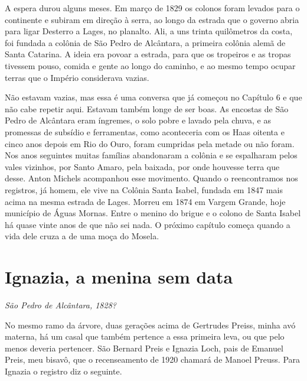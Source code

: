 \documentclass[
  brazilian,
  11pt,
  openany]{book}
\begin{document}
A espera durou alguns meses. Em março de 1829 os colonos foram levados
para o continente e subiram em direção à serra, ao longo da estrada que
o governo abria para ligar Desterro a Lages, no planalto. Ali, a uns
trinta quilômetros da costa, foi fundada a colônia de São Pedro de
Alcântara, a primeira colônia alemã de Santa Catarina. A ideia era
povoar a estrada, para que os tropeiros e as tropas tivessem pouso,
comida e gente ao longo do caminho, e ao mesmo tempo ocupar terras que o
Império considerava vazias.

Não estavam vazias, mas essa é uma conversa que já começou no Capítulo 6
e que não cabe repetir aqui. Estavam também longe de ser boas. As
encostas de São Pedro de Alcântara eram íngremes, o solo pobre e lavado
pela chuva, e as promessas de subsídio e ferramentas, como aconteceria
com os Haas oitenta e cinco anos depois em Rio do Ouro, foram cumpridas
pela metade ou não foram. Nos anos seguintes muitas famílias abandonaram
a colônia e se espalharam pelos vales vizinhos, por Santo Amaro, pela
baixada, por onde houvesse terra que desse. Anton Michels acompanhou
esse movimento. Quando o reencontramos nos registros, já homem, ele vive
na Colônia Santa Isabel, fundada em 1847 mais acima na mesma estrada de
Lages. Morreu em 1874 em Vargem Grande, hoje município de Águas Mornas.
Entre o menino do brigue e o colono de Santa Isabel há quase vinte anos
de que não sei nada. O próximo capítulo começa quando a vida dele cruza
a de uma moça do Mosela.

\section{Ignazia, a menina sem data}\label{ignazia-a-menina-sem-data}

\emph{São Pedro de Alcântara, 1828?}

No mesmo ramo da árvore, duas gerações acima de Gertrudes Preiss, minha
avó materna, há um casal que também pertence a essa primeira leva, ou
que pelo menos deveria pertencer. São Bernard Preis e Ignazia Loch, pais
de Emanuel Preis, meu bisavô, que o recenseamento de 1920 chamará de
Manoel Preuss. Para Ignazia o registro diz o seguinte.
\end{document}
